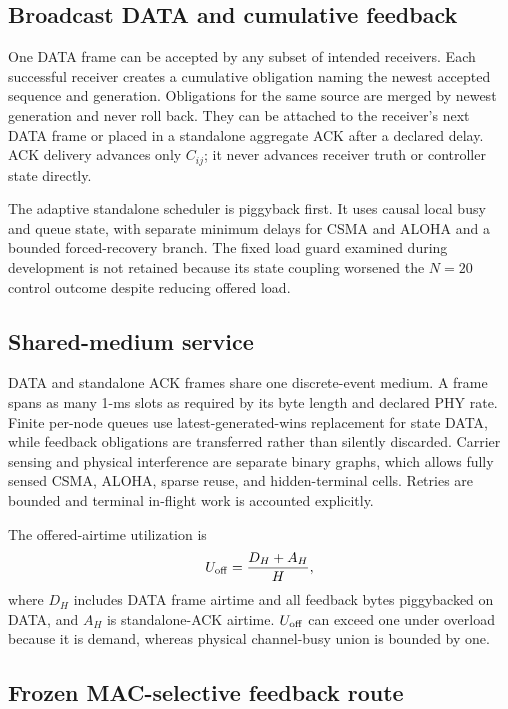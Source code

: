 \subsection{Broadcast DATA and cumulative feedback}

One DATA frame can be accepted by any subset of intended receivers. Each
successful receiver creates a cumulative obligation naming the newest accepted
sequence and generation. Obligations for the same source are merged by newest
generation and never roll back. They can be attached to the receiver's next
DATA frame or placed in a standalone aggregate ACK after a declared delay.
ACK delivery advances only $C_{ij}$; it never advances receiver truth or
controller state directly.

The adaptive standalone scheduler is piggyback first. It uses causal local
busy and queue state, with separate minimum delays for CSMA and ALOHA and a
bounded forced-recovery branch. The fixed load guard examined during
development is not retained because its state coupling worsened the $N=20$
control outcome despite reducing offered load.

\subsection{Shared-medium service}

DATA and standalone ACK frames share one discrete-event medium. A frame spans
as many 1-ms slots as required by its byte length and declared PHY rate.
Finite per-node queues use latest-generated-wins replacement for state DATA,
while feedback obligations are transferred rather than silently discarded.
Carrier sensing and physical interference are separate binary graphs, which
allows fully sensed CSMA, ALOHA, sparse reuse, and hidden-terminal cells.
Retries are bounded and terminal in-flight work is accounted explicitly.

The offered-airtime utilization is
\begin{equation}
U_{\rm off}=\frac{D_H+A_H}{H},
\end{equation}
where $D_H$ includes DATA frame airtime and all feedback bytes piggybacked on
DATA, and $A_H$ is standalone-ACK airtime. $U_{\rm off}$ can exceed one under
overload because it is demand, whereas physical channel-busy union is bounded
by one.

\subsection{Frozen MAC-selective feedback route}

